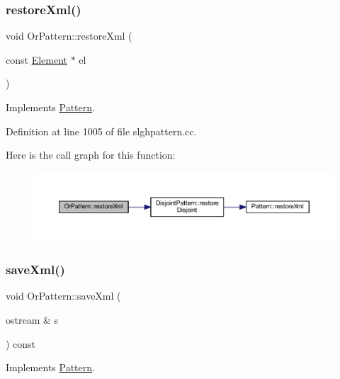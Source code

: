 \subsubsection{\texorpdfstring{restoreXml()}{restoreXml()}}
{\footnotesize\ttfamily void Or\+Pattern\+::restore\+Xml (\begin{DoxyParamCaption}\item[{const \mbox{\hyperlink{class_element}{Element}} $\ast$}]{el }\end{DoxyParamCaption})\hspace{0.3cm}{\ttfamily [virtual]}}



Implements \mbox{\hyperlink{class_pattern_aaa8fb2873854fb42d944fa8876102bb5}{Pattern}}.



Definition at line 1005 of file slghpattern.\+cc.

Here is the call graph for this function\+:
\nopagebreak
\begin{figure}[H]
\begin{center}
\leavevmode
\includegraphics[width=350pt]{class_or_pattern_a75be51aafaaf737dc8ae34cc5907b66f_cgraph}
\end{center}
\end{figure}
\mbox{\label{class_or_pattern_ace1bee495fdc71ae71193551ad0910eb}} 
\subsubsection{\texorpdfstring{saveXml()}{saveXml()}}
{\footnotesize\ttfamily void Or\+Pattern\+::save\+Xml (\begin{DoxyParamCaption}\item[{ostream \&}]{s }\end{DoxyParamCaption}) const\hspace{0.3cm}{\ttfamily [virtual]}}



Implements \mbox{\hyperlink{class_pattern_a1ad6c2ad66849318427095662b718fa9}{Pattern}}.



